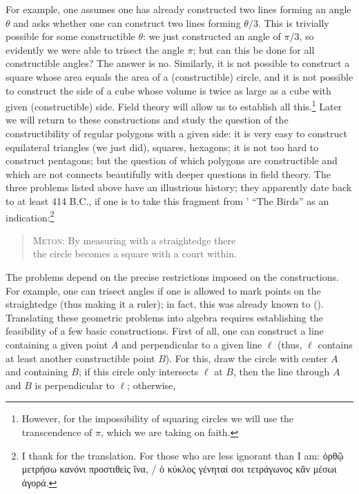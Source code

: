 For example, one assumes one has already constructed two lines forming
an angle $\theta$ and asks whether one can construct two lines forming
$\theta/3$. This is trivially possible for some constructible
$\theta$: we just constructed an angle of $\pi/3$, so evidently we
were able to trisect the angle $\pi$; but can this be done for all
constructible angles? The answer is no. Similarly, it is not possible
to construct a square whose area equals the area of a (constructible)
circle, and it is not possible to construct the side of a cube whose
volume is twice as large as a cube with given (constructible) side.
Field theory will allow us to establish all this.\footnote{However,
  for the impossibility of squaring circles we will use the
  transcendence of $\pi$, which we are taking on faith.} Later we will
return to these constructions and study the question of the
constructibility of regular polygons with a given side: it is very
easy to construct equilateral triangles (we just did), squares,
hexagons; it is not too hard to construct pentagons; but the question
of which polygons are constructible and which are not connects
beautifully with deeper questions in field theory.  The three problems
listed above have an illustrious history; they apparently date back to
at least 414 B.C., if one is to take this fragment from
' ``The Birds'' as an indication:\footnote{I thank
   for the translation. For those who are less
  ignorant than I am: {\greekfont ὀρθῷ μετρήσω κανόνι προστιθεὶς ἵνα, /
    ὁ κύκλος γένηταί σοι τετράγωνος κἂν μέσωι ἀγορά.}}
\begin{quote}
  \textsc{Meton}: By measuring with a straightedge there \\
  the circle becomes a square with a court within.
\end{quote}
The problems depend on the precise restrictions imposed on the
constructions. For example, one can trisect angles if one is allowed
to mark points on the straightedge (thus making it a ruler); in fact,
this was already known to 
().  Translating
these geometric problems into algebra requires establishing the
feasibility of a few basic constructions.  First of all, one can
construct a line containing a given point $A$ and perpendicular to a
given line $\ell$ (thus, $\ell$ contains at least another
constructible point $B$). For this, draw the circle with center $A$
and containing $B$; if this circle only intersects $\ell$ at $B$, then
the line through $A$ and $B$ is perpendicular to $\ell$; otherwise,
